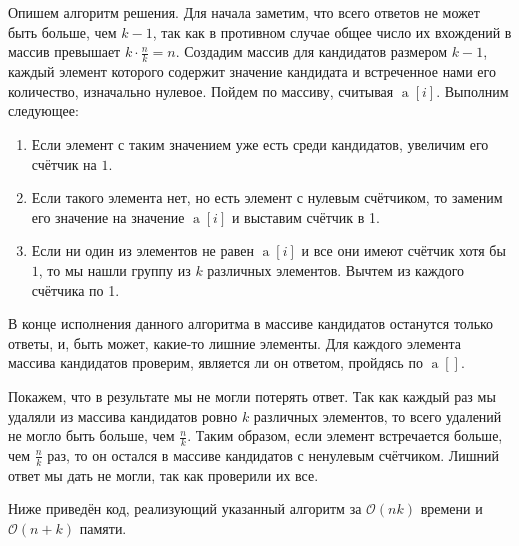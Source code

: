 \section{}
	Опишем алгоритм решения. Для начала заметим, что всего ответов не может быть больше, чем $k-1$, так как в противном случае общее число их вхождений в массив превышает $k\cdot\frac{n}{k} = n$. Создадим массив  для кандидатов размером $k-1$, каждый элемент которого содержит значение кандидата и встреченное нами его количество, изначально нулевое. Пойдем по массиву, считывая $\operatorname{a}[i]$. Выполним следующее:
	\begin{enumerate}
		\item Если элемент с таким значением уже есть среди кандидатов, увеличим его счётчик на $1$.
		\item Если такого элемента нет, но есть элемент с нулевым счётчиком, то заменим его значение на значение $\operatorname{a}[i]$ и выставим счётчик в 1.
		\item Если ни один из элементов не равен $\operatorname{a}[i]$ и все они имеют счётчик хотя бы $1$, то мы нашли группу из $k$ различных элементов. Вычтем из каждого счётчика по 1.
	\end{enumerate}
	В конце исполнения данного алгоритма в массиве кандидатов останутся только ответы, и, быть может, какие-то лишние элементы. Для каждого элемента массива кандидатов проверим, является ли он ответом, пройдясь по $\operatorname{a}[]$.
	
	Покажем, что в результате мы не могли потерять ответ. Так как каждый раз мы удаляли из массива кандидатов ровно $k$ различных элементов, то всего удалений не могло быть больше, чем $\frac{n}{k}$. Таким образом, если элемент встречается больше, чем $\frac{n}{k}$ раз, то он остался в массиве кандидатов с ненулевым счётчиком. Лишний ответ мы дать не могли, так как проверили их все.
	
	Ниже приведён код, реализующий указанный алгоритм за $\mathcal{O}(nk)$ времени и $\mathcal{O}(n + k)$ памяти.
	
	\newpage
